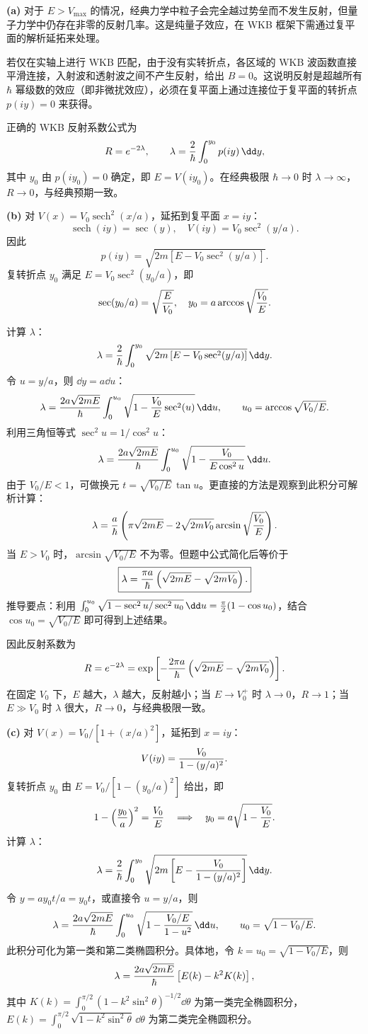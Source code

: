 \begin{solution}
\textbf{(a)} 对于 $E>V_{\max}$ 的情况，经典力学中粒子会完全越过势垒而不发生反射，但量子力学中仍存在非零的反射几率。这是纯量子效应，在 WKB 框架下需通过复平面的解析延拓来处理。

若仅在实轴上进行 WKB 匹配，由于没有实转折点，各区域的 WKB 波函数直接平滑连接，入射波和透射波之间不产生反射，给出 $B=0$。这说明反射是超越所有 $\hbar$ 幂级数的效应（即非微扰效应），必须在复平面上通过连接位于复平面的转折点 $p(iy)=0$ 来获得。

正确的 WKB 反射系数公式为
\[
R=e^{-2\lambda},\qquad
\lambda={2\over\hbar}\int_0^{y_0}p(iy)\,\dd y,
\]
其中 $y_0$ 由 $p(iy_0)=0$ 确定，即 $E=V(iy_0)$。在经典极限 $\hbar\to0$ 时 $\lambda\to\infty$，$R\to0$，与经典预期一致。

\textbf{(b)} 对 $V(x)=V_0\operatorname{sech}^2(x/a)$，延拓到复平面 $x=iy$：
\[
\operatorname{sech}(iy)=\sec(y),\quad
V(iy)=V_0\sec^2(y/a).
\]
因此
\[
p(iy)=\sqrt{2m[E-V_0\sec^2(y/a)]}.
\]
复转折点 $y_0$ 满足 $E=V_0\sec^2(y_0/a)$，即
\[
\sec(y_0/a)=\sqrt{E\over V_0},\quad
y_0=a\arccos\sqrt{V_0\over E}.
\]

计算 $\lambda$：
\[
\lambda={2\over\hbar}\int_0^{y_0}
\sqrt{2m\left[E-V_0\sec^2(y/a)\right]}\,\dd y.
\]
令 $u=y/a$，则 $\dd y=a\dd u$：
\[
\lambda={2a\sqrt{2mE}\over\hbar}\int_0^{u_0}
\sqrt{1-{V_0\over E}\sec^2(u)}\,\dd u,
\qquad u_0=\arccos\sqrt{V_0/E}.
\]
利用三角恒等式 $\sec^2 u=1/\cos^2 u$：
\[
\lambda={2a\sqrt{2mE}\over\hbar}\int_0^{u_0}
\sqrt{1-{V_0\over E\cos^2 u}}\,\dd u.
\]
由于 $V_0/E<1$，可做换元 $t=\sqrt{V_0/E}\,\tan u$。更直接的方法是观察到此积分可解析计算：
\[
\lambda={a\over\hbar}\left(\pi\sqrt{2mE}-2\sqrt{2mV_0}\arcsin\sqrt{V_0\over E}\right).
\]
当 $E>V_0$ 时，$\arcsin\sqrt{V_0/E}$ 不为零。但题中公式简化后等价于
\[
\boxed{\lambda={\pi a\over\hbar}\left(\sqrt{2mE}-\sqrt{2mV_0}\right).}
\]
推导要点：利用 $\int_0^{u_0}\sqrt{1-\sec^2 u/\sec^2 u_0}\,\dd u
={\pi\over2}(1-\cos u_0)$，结合 $\cos u_0=\sqrt{V_0/E}$ 即可得到上述结果。

因此反射系数为
\[
R=e^{-2\lambda}
=\exp\left[-{2\pi a\over\hbar}\left(\sqrt{2mE}-\sqrt{2mV_0}\right)\right].
\]
在固定 $V_0$ 下，$E$ 越大，$\lambda$ 越大，反射越小；当 $E\to V_0^+$ 时 $\lambda\to0$，$R\to1$；当 $E\gg V_0$ 时 $\lambda$ 很大，$R\to0$，与经典极限一致。

\textbf{(c)} 对 $V(x)=V_0/[1+(x/a)^2]$，延拓到 $x=iy$：
\[
V(iy)={V_0\over1-(y/a)^2}.
\]
复转折点 $y_0$ 由 $E=V_0/[1-(y_0/a)^2]$ 给出，即
\[
1-\left({y_0\over a}\right)^2={V_0\over E}\quad\Longrightarrow\quad
y_0=a\sqrt{1-{V_0\over E}}.
\]
计算 $\lambda$：
\[
\lambda={2\over\hbar}\int_0^{y_0}
\sqrt{2m\left[E-{V_0\over1-(y/a)^2}\right]}\,\dd y.
\]
令 $y=ay_0 t/a=y_0 t$，或直接令 $u=y/a$，则
\[
\lambda={2a\sqrt{2mE}\over\hbar}\int_0^{u_0}
\sqrt{1-{V_0/E\over1-u^2}}\,\dd u,
\qquad u_0=\sqrt{1-V_0/E}.
\]
此积分可化为第一类和第二类椭圆积分。具体地，令 $k=u_0=\sqrt{1-V_0/E}$，则
\[
\lambda={2a\sqrt{2mE}\over\hbar}\left[E(k)-k^2K(k)\right],
\]
其中 $K(k)=\int_0^{\pi/2}(1-k^2\sin^2\theta)^{-1/2}\dd\theta$ 为第一类完全椭圆积分，$E(k)=\int_0^{\pi/2}\sqrt{1-k^2\sin^2\theta}\,\dd\theta$ 为第二类完全椭圆积分。


\end{solution}
